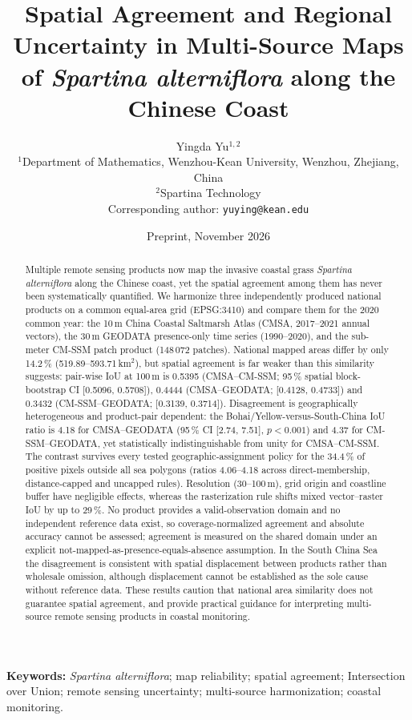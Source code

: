 \documentclass[11pt]{article}
\title{Spatial Agreement and Regional Uncertainty in Multi-Source Maps of
\textit{Spartina alterniflora} along the Chinese Coast}
\author{Yingda Yu$^{1,2}$\\[4pt]
  \small $^{1}$Department of Mathematics, Wenzhou-Kean University,
  Wenzhou, Zhejiang, China\\
  \small $^{2}$Spartina Technology\\[3pt]
  \small Corresponding author: \texttt{yuying@kean.edu}}
\date{Preprint, November 2026}
\begin{document}
\maketitle

\begin{abstract}
Multiple remote sensing products now map the invasive coastal grass
\textit{Spartina alterniflora} along the Chinese coast, yet the spatial
agreement among them has never been systematically quantified. We harmonize
three independently produced national products on a common equal-area grid
(EPSG:3410) and compare them for the 2020 common year: the 10\,m China Coastal
Saltmarsh Atlas (CMSA, 2017--2021 annual vectors), the 30\,m GEODATA
presence-only time series (1990--2020), and the sub-meter CM-SSM patch
product (148\,072 patches). National mapped areas differ by only 14.2\,\%
(519.89--593.71\,km$^2$), but spatial agreement is far weaker than this
similarity suggests: pair-wise IoU at 100\,m is 0.5395 (CMSA--CM-SSM;
95\,\% spatial block-bootstrap CI [0.5096, 0.5708]), 0.4444
(CMSA--GEODATA; [0.4128, 0.4733]) and 0.3432 (CM-SSM--GEODATA;
[0.3139, 0.3714]). Disagreement is geographically heterogeneous and
product-pair dependent: the Bohai/Yellow-versus-South-China IoU ratio is
4.18 for CMSA--GEODATA (95\,\% CI [2.74, 7.51], $p<0.001$) and 4.37 for
CM-SSM--GEODATA, yet statistically indistinguishable from unity for
CMSA--CM-SSM. The contrast survives every tested geographic-assignment
policy for the 34.4\,\% of positive pixels outside all sea polygons
(ratios 4.06--4.18 across direct-membership, distance-capped and uncapped
rules). Resolution (30--100\,m), grid origin and coastline buffer have
negligible effects, whereas the rasterization rule shifts mixed
vector--raster IoU by up to 29\,\%. No product provides a
valid-observation domain and no independent reference data exist, so
coverage-normalized agreement and absolute accuracy cannot be assessed;
agreement is measured on the shared domain under an explicit
not-mapped-as-presence-equals-absence assumption. In the South China Sea
the disagreement is consistent with spatial displacement between products
rather than wholesale omission, although displacement cannot be established
as the sole cause without reference data. These results caution that
national area similarity does not guarantee spatial agreement, and provide
practical guidance for interpreting multi-source remote sensing products in
coastal monitoring.
\end{abstract}

\textbf{Keywords:} \textit{Spartina alterniflora}; map reliability; spatial
agreement; Intersection over Union; remote sensing uncertainty; multi-source
harmonization; coastal monitoring.
\end{document}
